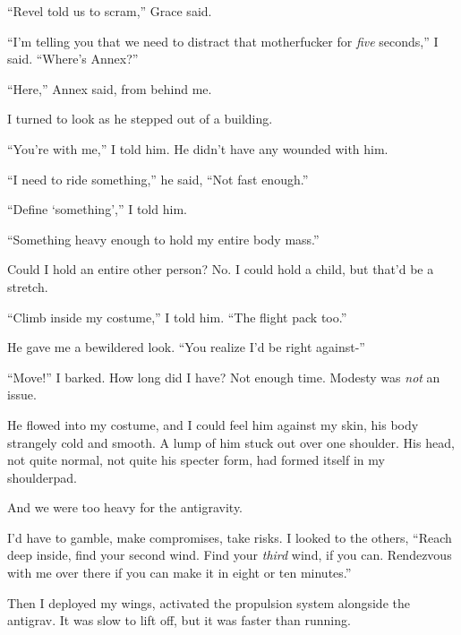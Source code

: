 ``Revel told us to scram,'' Grace said.



``I'm telling you that we need to distract that motherfucker for \emph{five} seconds,'' I said.  ``Where's Annex?''



``Here,'' Annex said, from behind me.



I turned to look as he stepped out of a building.



``You're with me,'' I told him.  He didn't have any wounded with him.



``I need to ride something,'' he said, ``Not fast enough.''



``Define `something','' I told him.



``Something heavy enough to hold my entire body mass.''



Could I hold an entire other person?  No.  I could hold a child, but that'd be a stretch.



``Climb inside my costume,'' I told him.  ``The flight pack too.''



He gave me a bewildered look.  ``You realize I'd be right against-''



``Move!''  I barked.  How long did I have?  Not enough time.  Modesty was \emph{not} an issue.



He flowed into my costume, and I could feel him against my skin, his body strangely cold and smooth.  A lump of him stuck out over one shoulder.  His head, not quite normal, not quite his specter form, had formed itself in my shoulderpad.



And we were too heavy for the antigravity.



I'd have to gamble, make compromises, take risks.  I looked to the others, ``Reach deep inside, find your second wind.  Find your \emph{third} wind, if you can.  Rendezvous with me over there if you can make it in eight or ten minutes.''



Then I deployed my wings, activated the propulsion system alongside the antigrav.  It was slow to lift off, but it was faster than running. 



